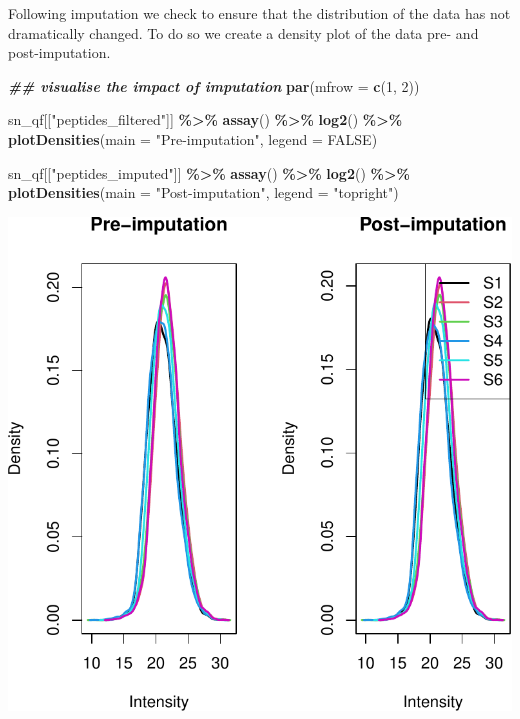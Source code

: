 \documentclass[9pt,a4paper,]{extarticle}
\newenvironment{Shaded}{\begin{snugshade}}{\end{snugshade}}
\newcommand{\AttributeTok}[1]{\textcolor[rgb]{0.13,0.29,0.53}{#1}}
\newcommand{\ConstantTok}[1]{\textcolor[rgb]{0.56,0.35,0.01}{#1}}
\newcommand{\DecValTok}[1]{\textcolor[rgb]{0.00,0.00,0.81}{#1}}
\newcommand{\DocumentationTok}[1]{\textcolor[rgb]{0.56,0.35,0.01}{\textbf{\textit{#1}}}}
\newcommand{\FunctionTok}[1]{\textcolor[rgb]{0.13,0.29,0.53}{\textbf{#1}}}
\newcommand{\NormalTok}[1]{#1}
\newcommand{\SpecialCharTok}[1]{\textcolor[rgb]{0.81,0.36,0.00}{\textbf{#1}}}
\newcommand{\StringTok}[1]{\textcolor[rgb]{0.31,0.60,0.02}{#1}}
\begin{document}
Following imputation we check to ensure that the distribution of the data has
not dramatically changed. To do so we create a density plot of the data pre- and
post-imputation.

\begin{Shaded}
\begin{Highlighting}[]
\DocumentationTok{\#\# visualise the impact of imputation}
\FunctionTok{par}\NormalTok{(}\AttributeTok{mfrow =} \FunctionTok{c}\NormalTok{(}\DecValTok{1}\NormalTok{, }\DecValTok{2}\NormalTok{))}

\NormalTok{sn\_qf[[}\StringTok{"peptides\_filtered"}\NormalTok{]] }\SpecialCharTok{\%\textgreater{}\%}
  \FunctionTok{assay}\NormalTok{() }\SpecialCharTok{\%\textgreater{}\%}
  \FunctionTok{log2}\NormalTok{() }\SpecialCharTok{\%\textgreater{}\%}
  \FunctionTok{plotDensities}\NormalTok{(}\AttributeTok{main =} \StringTok{"Pre{-}imputation"}\NormalTok{,}
                \AttributeTok{legend =} \ConstantTok{FALSE}\NormalTok{)}

\NormalTok{sn\_qf[[}\StringTok{"peptides\_imputed"}\NormalTok{]] }\SpecialCharTok{\%\textgreater{}\%}
  \FunctionTok{assay}\NormalTok{() }\SpecialCharTok{\%\textgreater{}\%}
  \FunctionTok{log2}\NormalTok{() }\SpecialCharTok{\%\textgreater{}\%}
  \FunctionTok{plotDensities}\NormalTok{(}\AttributeTok{main =} \StringTok{"Post{-}imputation"}\NormalTok{,}
                \AttributeTok{legend =} \StringTok{"topright"}\NormalTok{)}
\end{Highlighting}
\end{Shaded}

\begin{center}\includegraphics[width=0.8\linewidth]{workflow_expressions_files/figure-latex/lfq_imputation_4-1} \end{center}
\end{document}
